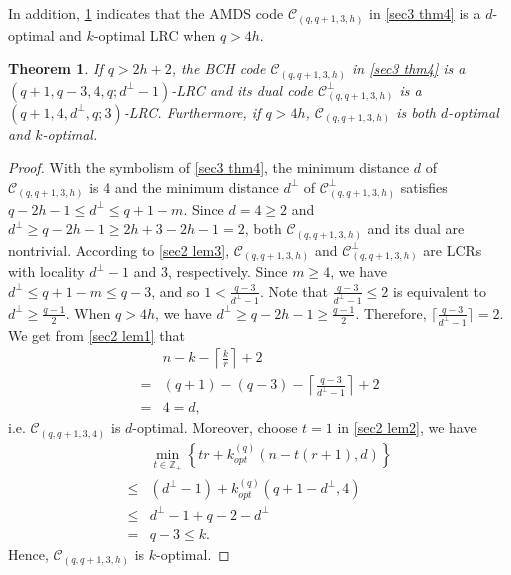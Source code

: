 \documentclass[10pt]{article}%
\newtheorem{theorem}{Theorem}%
\begin{document}
	
	In addition, \cref{sec3 thm5} indicates that the AMDS code $\mathcal{C}_{(q,q+1,3,h)}$ in \cref{sec3 thm4} is a $d$-optimal and $k$-optimal LRC when $q>4h$. 
	\begin{theorem}
		\label{sec3 thm5}
		If $q>2h+2$, the BCH code $\mathcal{C}_{(q,q+1,3,h)}$ in \cref{sec3 thm4} is a $(q+1,q-3,4,q;d^\perp-1)$-LRC and its dual code $\mathcal{C}^\perp_{(q,q+1,3,h)}$ is a $(q+1,4,d^\perp,q;3)$-LRC. Furthermore, if $q>4h$, $\mathcal{C}_{(q,q+1,3,h)}$ is both $d$-optimal and $k$-optimal.
	\end{theorem}
	\begin{proof}
		With the symbolism of \cref{sec3 thm4}, the minimum distance $d$ of $\mathcal{C}_{(q,q+1,3,h)}$ is 4 and the minimum distance $d^\perp$ of $\mathcal{C}_{(q,q+1,3,h)}^\perp$ satisfies $q-2h-1 \le d^\perp \le q+1-m$. Since $d=4\ge2$ and $d^\perp\ge q-2h-1\ge2h+3-2h-1=2$, both $\mathcal{C}_{(q,q+1,3,h)}$ and its dual are nontrivial. According to \cref{sec2 lem3}, $\mathcal{C}_{(q,q+1,3,h)}$ and $\mathcal{C}^\perp_{(q,q+1,3,h)}$ are LCRs with locality $d^\perp-1$ and 3, respectively. Since $m\ge4$, we have $d^\perp \le q+1-m \le q-3$, and so $1<\frac{q-3}{d^{\perp}-1}$. Note that $\frac{q-3}{d^{\perp}-1}\le2$ is equivalent to $d^\perp\ge\frac{q-1}{2}$. When $q>4h$, we have $d^\perp\ge q-2h-1 \ge\frac{q-1}{2}$. Therefore, $\lceil\frac{q-3}{d^\perp-1}\rceil=2.$ We get from \cref{sec2 lem1} that
		\begin{equation*}
			\begin{aligned}
				&n-k-\left\lceil{\frac{k}{r}}\right\rceil+2 \\
				=&(q+1)-(q-3)-\left\lceil\frac{q-3}{d^\perp-1}\right\rceil+2 \\
				=&4=d,
			\end{aligned}
		\end{equation*}
		i.e. $\mathcal{C}_{(q,q+1,3,4)}$ is $d$-optimal. Moreover, choose $t=1$ in \cref{sec2 lem2}, we have 
		\begin{equation*}
			\begin{aligned}
				&\operatorname*{min}_{t\in\mathbb{Z}_{+}}\left\{tr+k_{opt}^{(q)}(n-t(r+1),d)\right\}\\
				\leq&(d^{\perp}-1)+k_{opt}^{(q)}(q+1-d^{\perp},4) \\
				\leq&d^{\perp}-1+q-2-d^{\perp} \\
				=&q-3\leq k.
			\end{aligned}
		\end{equation*}
		Hence, $\mathcal{C}_{(q,q+1,3,h)}$ is $k$-optimal.
	\end{proof}
	
\end{document}
